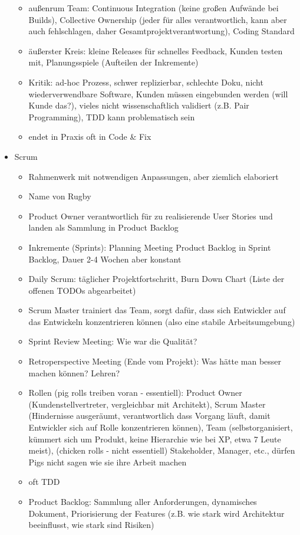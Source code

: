 \documentclass[paper=a4, fontsize=11pt]{scrartcl} %
\numberwithin{equation}{section} %
\numberwithin{figure}{section} %
\numberwithin{table}{section} %
\begin{document}
\begin{itemize}
\begin{itemize}
    \item außenrum Team: Continuous Integration (keine großen Aufwände bei Builds), Collective Ownership (jeder für alles verantwortlich, kann aber auch fehlschlagen, daher Gesamtprojektverantwortung), Coding Standard
    \item äußerster Kreis: kleine Releases für schnelles Feedback, Kunden testen mit, Planungsspiele (Aufteilen der Inkremente)
    \item Kritik: ad-hoc Prozess, schwer replizierbar, schlechte Doku, nicht wiederverwendbare Software, Kunden müssen eingebunden werden (will Kunde das?), vieles nicht wissenschaftlich validiert (z.B. Pair Programming), TDD kann problematisch sein
    \item endet in Praxis oft in Code \& Fix
  \end{itemize}
  \item Scrum
  \begin{itemize}
    \item Rahmenwerk mit notwendigen Anpassungen, aber ziemlich elaboriert
    \item Name von Rugby
    \item Product Owner verantwortlich für zu realisierende User Stories und landen als Sammlung in Product Backlog
    \item Inkremente (Sprints): Planning Meeting Product Backlog in Sprint Backlog, Dauer 2-4 Wochen aber konstant
    \item Daily Scrum: täglicher Projektfortschritt, Burn Down Chart (Liste der offenen TODOs abgearbeitet)
    \item Scrum Master trainiert das Team, sorgt dafür, dass sich Entwickler auf das Entwickeln konzentrieren können (also eine stabile Arbeitsumgebung)
    \item Sprint Review Meeting: Wie war die Qualität?
    \item Retroperspective Meeting (Ende vom Projekt): Was hätte man besser machen können? Lehren?
    \item Rollen (pig rolls treiben voran - essentiell): Product Owner (Kundenstellvertreter, vergleichbar mit Architekt), Scrum Master (Hindernisse ausgeräumt, verantwortlich dass Vorgang läuft, damit Entwickler sich auf Rolle konzentrieren können), Team (selbstorganisiert, kümmert sich um Produkt, keine Hierarchie wie bei XP, etwa 7 Leute meist), (chicken rolls - nicht essentiell) Stakeholder, Manager, etc., dürfen Pigs nicht sagen wie sie ihre Arbeit machen
    \item oft TDD
    \item Product Backlog: Sammlung aller Anforderungen, dynamisches Dokument, Priorisierung der Features (z.B. wie stark wird Architektur beeinflusst, wie stark sind Risiken)

\end{itemize}
\end{itemize}
\end{document}
